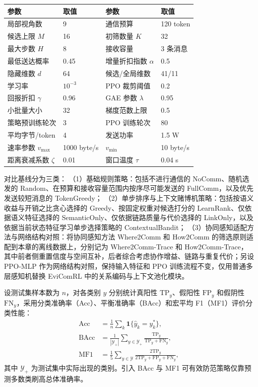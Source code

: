 \begin{table}[htbp]
\centering
{}
\label{rq2:tab:parameters}
\small
\setlength{\tabcolsep}{5pt}
\renewcommand{\arraystretch}{0.92}
\begin{tabular}{ll ll}
\toprule
参数 & 取值 & 参数 & 取值\\
\midrule
局部视角数 & 9 & 通信预算 & 120 token\\
候选上限 $M$ & 16 & 初筛数量 $K$ & 32\\
最大步数 $H$ & 8 & 接收容量 & 3 条消息\\
最低送达概率 & 0.45 & 增量折扣指数 $\alpha$ & 0.5\\
隐藏维数 $d$ & 64 & 候选/全局维数 & 41/11\\
学习率 & $10^{-3}$ & PPO 裁剪阈值 & 0.2\\
回报折扣 $\gamma$ & 0.96 & GAE 参数 $\lambda$ & 0.95\\
小批量大小 & 32 & 梯度范数上限 & 0.5\\
策略预训练轮次 & 3 & PPO 训练轮次 & 80\\
平均字节/token & 4 & 发送功率 & 1.5 W\\
速率参数 $v_{\max}$ & 1000 byte/s & $v_{\min}$ & 10 byte/s\\
距离衰减系数 $\zeta$ & 0.01 & 窗口温度 $\tau$ & 0.04 s\\
\bottomrule
\end{tabular}
\end{table}

对比基线分为三类：
（1）基础规则策略：包括不进行通信的 NoComm、随机选发的 Random、在预算和接收容量范围内按序尽可能发送的 FullComm，以及优先发送较短消息的 TokenGreedy；
（2）单步排序与上下文赌博机策略：包括按语义收益与开销之比贪心选择的 Greedy、按固定权重对候选打分的 LearnRank、仅依据语义特征选择的 SemanticOnly、仅依据链路质量与代价选择的 LinkOnly，以及依据当前状态特征学习单步选择策略的 ContextualBandit；
（3）协同感知适配方法与网络结构对照：将协同感知方法 Where2Comm 和 How2Comm 的筛选原则适配到本章的离线数据上，分别记为 Where2Comm-Trace 和 How2Comm-Trace\cite{where2comm,how2comm}，其中前者侧重置信度与空间互补，后者综合考虑协作增益、链路与重复代价；另设 PPO-MLP 作为网络结构对照，保持输入特征和 PPO 训练流程不变，仅用普通多层感知机替换 EviComRL 中的关系编码与上下文池化模块。

设测试集样本数为 $n$，对各类别 $y$ 分别统计真阳性 $\mathrm{TP}_y$、假阳性 $\mathrm{FP}_y$ 和假阴性 $\mathrm{FN}_y$，采用分类准确率（Acc）、平衡准确率（BAcc）和宏平均 F1（MF1）评价分类性能：
\begin{equation}
\begin{aligned}
\mathrm{Acc}&=\frac1n\sum_k\mathbf1\{\hat y_k=y_k^*\},\\
\mathrm{BAcc}&=\frac1{|\mathcal Y_+|}\sum_{y\in\mathcal Y_+}
\frac{\mathrm{TP}_y}{\mathrm{TP}_y+\mathrm{FN}_y},\\
\mathrm{MF1}&=\frac15\sum_{y\in\mathcal Y}
\frac{2\mathrm{TP}_y}{2\mathrm{TP}_y+\mathrm{FP}_y+\mathrm{FN}_y},
\end{aligned}
\label{rq2:eq:metrics}
\end{equation}
其中 $\mathcal Y_+$ 为测试集中实际出现的类别。引入 BAcc 与 MF1 可有效防范策略仅靠预测多数类刷高总体准确率。

